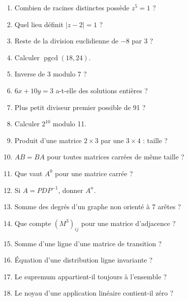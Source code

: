 \begin{enumerate}
\item Combien de racines distinctes possède $z^5=1$ ?
\item Quel lieu définit $|z-2|=1$ ?
\item Reste de la division euclidienne de $-8$ par 3 ?
\item Calculer $\operatorname{pgcd}(18,24)$.
\item Inverse de 3 modulo 7 ?
\item $6x+10y=3$ a-t-elle des solutions entières ?
\item Plus petit diviseur premier possible de 91 ?
\item Calculer $2^{10}$ modulo 11.
\item Produit d’une matrice $2\times3$ par une $3\times4$ : taille ?
\item $AB=BA$ pour toutes matrices carrées de même taille ?
\item Que vaut $A^0$ pour une matrice carrée ?
\item Si $A=PDP^{-1}$, donner $A^n$.
\item Somme des degrés d’un graphe non orienté à 7 arêtes ?
\item Que compte $(M^3)_{ij}$ pour une matrice d’adjacence ?
\item Somme d’une ligne d’une matrice de transition ?
\item Équation d’une distribution ligne invariante ?
\item Le supremum appartient-il toujours à l’ensemble ?
\item Le noyau d’une application linéaire contient-il zéro ?\end{enumerate}
